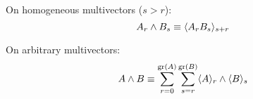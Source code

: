 \begin{definition}
	On homogeneous multivectors ($s>r$):
	\[A_r \wedge B_s \equiv \langle A_rB_s \rangle_{s+r}\]
	
	On arbitrary multivectors:
	\[A \wedge B \equiv \sum_{r=0}^{\mathrm{gr}\left(A\right)}\sum_{s=r}^{\mathrm{gr}\left(B\right)} \langle A \rangle_{r} \wedge \langle B \rangle_{s}\]
\end{definition}

